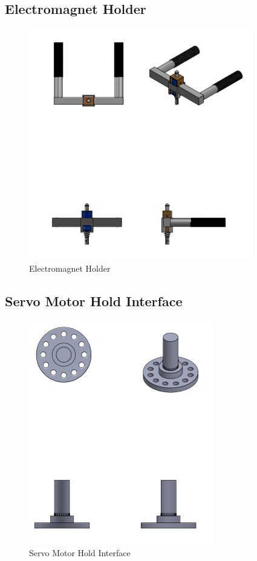 \subsection{Electromagnet Holder}
\begin{figure}[H]
    \centering
    \includegraphics{Figures/electromagnetholder.PNG}
    \caption{Electromagnet Holder}
\end{figure}

\subsection{Servo Motor Hold Interface }
\begin{figure}[H]
    \centering
    \includegraphics{Figures/servo hold.PNG}
    \caption{Servo Motor Hold Interface}
\end{figure}
